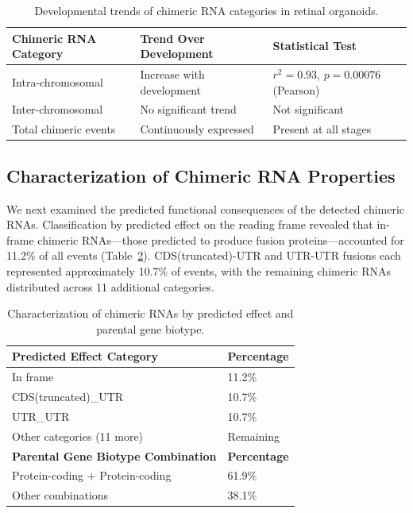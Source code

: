 \documentclass[12pt]{article}
\begin{document}
\begin{table}[htbp]
\centering
\caption{Developmental trends of chimeric RNA categories in retinal organoids.}
\label{tab:trends}
\begin{tabular}{lll}
\toprule
Chimeric RNA Category & Trend Over Development & Statistical Test \\
\midrule
Intra-chromosomal & Increase with development & $r^2 = 0.93$, $p = 0.00076$ (Pearson) \\
Inter-chromosomal & No significant trend & Not significant \\
Total chimeric events & Continuously expressed & Present at all stages \\
\bottomrule
\end{tabular}
\end{table}

\subsection{Characterization of Chimeric RNA Properties}

We next examined the predicted functional consequences of the detected chimeric RNAs. Classification by predicted effect on the reading frame revealed that in-frame chimeric RNAs---those predicted to produce fusion proteins---accounted for 11.2\% of all events (Table~\ref{tab:characterization}). CDS(truncated)-UTR and UTR-UTR fusions each represented approximately 10.7\% of events, with the remaining chimeric RNAs distributed across 11 additional categories.

\begin{table}[htbp]
\centering
\caption{Characterization of chimeric RNAs by predicted effect and parental gene biotype.}
\label{tab:characterization}
\begin{tabular}{ll}
\toprule
Predicted Effect Category & Percentage \\
\midrule
In frame & 11.2\% \\
CDS(truncated)\_UTR & 10.7\% \\
UTR\_UTR & 10.7\% \\
Other categories (11 more) & Remaining \\
\midrule
\textbf{Parental Gene Biotype Combination} & \textbf{Percentage} \\
\midrule
Protein-coding + Protein-coding & 61.9\% \\
Other combinations & 38.1\% \\
\bottomrule
\end{tabular}
\end{table}
\end{document}
